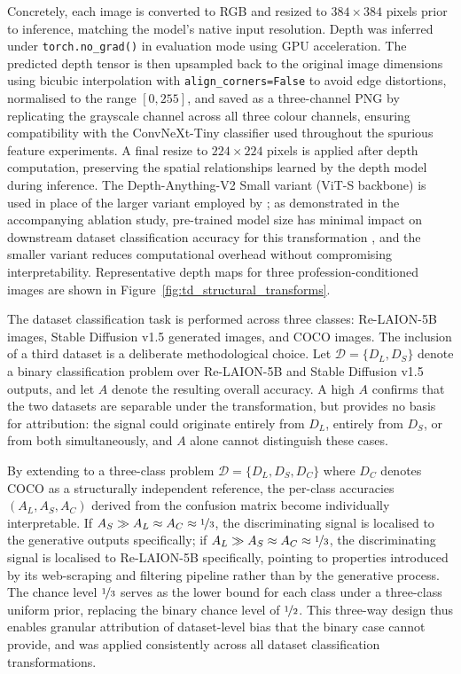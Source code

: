Concretely, each image is converted to RGB and resized to $384 \times 384$ 
pixels prior to inference, matching the model's native input resolution. Depth 
was inferred under \texttt{torch.no\_grad()} in evaluation mode using GPU 
acceleration. The predicted depth tensor is then upsampled back to the 
original image dimensions using bicubic interpolation with 
\texttt{align\_corners=False} to avoid edge distortions, normalised to the 
range $[0, 255]$, and saved as a three-channel PNG by replicating the 
grayscale channel across all three colour channels, ensuring compatibility 
with the ConvNeXt-Tiny classifier used throughout the spurious feature 
experiments. A final resize to $224 \times 224$ pixels is applied after depth 
computation, preserving the spatial relationships learned 
by the depth model during inference. The Depth-Anything-V2 Small variant 
(ViT-S backbone) is used in place of the larger variant employed by 
\cite{Zeng_2024_UnderstandingBiasinLargeScaleVisualDatasets}; as demonstrated 
in the accompanying ablation study, pre-trained model size has minimal impact 
on downstream dataset classification accuracy for this transformation 
\cite[Table~3]{Zeng_2024_UnderstandingBiasinLargeScaleVisualDatasets}, and the 
smaller variant reduces computational overhead without compromising 
interpretability. Representative depth maps for three profession-conditioned images are 
shown in Figure~\ref{fig:td_structural_transforms}.

The dataset classification task is performed across three classes: Re-LAION-5B 
images, Stable Diffusion v1.5 generated images, and COCO images. The 
inclusion of a third dataset is a deliberate methodological choice. Let 
$\mathcal{D} = \{D_L, D_S\}$ denote a binary classification problem over 
Re-LAION-5B and Stable Diffusion v1.5 outputs, and let $A$ denote the 
resulting overall accuracy. A high $A$ confirms that the two datasets are 
separable under the transformation, but provides no basis for attribution: 
the signal could originate entirely from $D_L$, entirely from $D_S$, or 
from both simultaneously, and $A$ alone cannot distinguish these cases.

By extending to a three-class problem $\mathcal{D} = \{D_L, D_S, D_C\}$ 
where $D_C$ denotes COCO as a structurally independent reference, the 
per-class accuracies $(A_L, A_S, A_C)$ derived from the confusion matrix 
become individually interpretable. If $A_S \gg A_L \approx A_C \approx 
\nicefrac{1}{3}$, the discriminating signal is localised to the generative 
outputs specifically; if $A_L \gg A_S \approx A_C \approx \nicefrac{1}{3}$, 
the discriminating signal is localised to Re-LAION-5B specifically, pointing 
to properties introduced by its web-scraping and filtering pipeline rather 
than by the generative process. The chance level $\nicefrac{1}{3}$ serves as 
the lower bound for each class under a three-class uniform prior, replacing 
the binary chance level of $\nicefrac{1}{2}$. This three-way design thus 
enables granular attribution of dataset-level bias that the binary case cannot 
provide, and was applied consistently across all dataset classification 
transformations.

